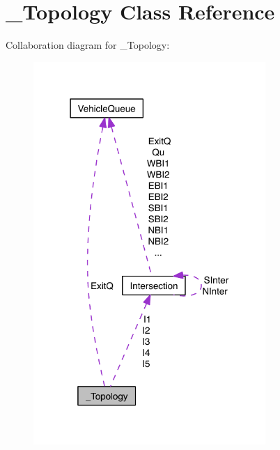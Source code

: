 \hypertarget{class___topology}{\section{\-\_\-\-Topology Class Reference}
\label{class___topology}
}


Collaboration diagram for \-\_\-\-Topology\-:\nopagebreak
\begin{figure}[H]
\begin{center}
\leavevmode
\includegraphics[width=250pt]{class___topology__coll__graph}
\end{center}
\end{figure}
